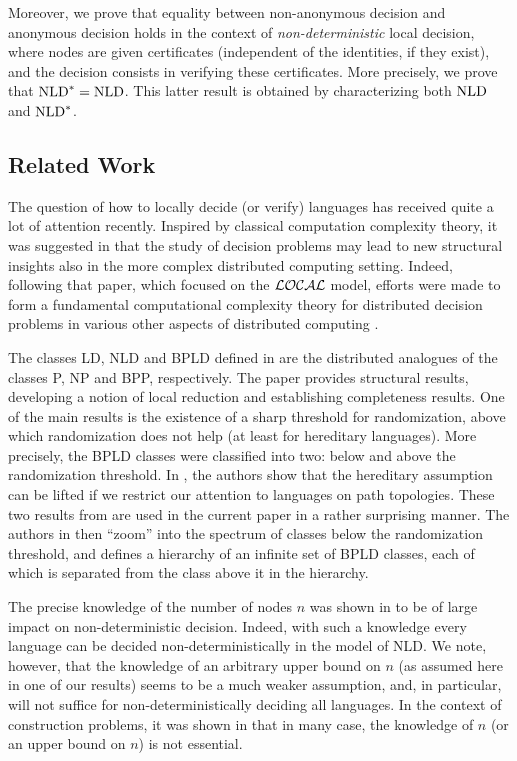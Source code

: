\documentclass{llncs}
\newcommand{\NLD}{\mbox{\rm NLD}}
\begin{document}
Moreover, we prove that equality between non-anonymous decision and anonymous decision holds in the context of \emph{non-deterministic} local decision, where nodes are given certificates (independent of the identities, if they exist), and the decision consists in verifying these certificates. More precisely, we prove that $\NLD^*=\NLD$. This latter result is obtained by characterizing both $\NLD$ and $\NLD^*$. 

\subsection{Related Work}
The question of how to locally decide (or verify)  languages has 
received quite a lot of attention recently. 
Inspired by classical computation complexity theory,
it was suggested in \cite{FKP11} that the study of decision problems may lead to new
structural insights also in the more complex distributed computing setting.
Indeed, following that paper, which focused on the $\cal{LOCAL}$ model, efforts were made to form a fundamental
computational complexity theory for distributed decision problems in
various other aspects of distributed computing
\cite{FKP11,FP12,FRT11,FRT12}.

The classes LD, NLD and BPLD defined in \cite{FKP11} are
the distributed analogues of the classes  P, NP and BPP, respectively.
The paper provides structural results,
developing a notion of local reduction and establishing completeness results.
One of the main results is the existence of a sharp threshold for randomization,
above which randomization does not help (at least for hereditary languages). 
More precisely, the BPLD classes were classified into two:
below and above the randomization threshold. 
In \cite{FKPP12}, the authors show that the hereditary assumption can be lifted if we restrict our attention
to languages on path topologies. 
These two results from \cite{FKP11,FKPP12}  are used in the current paper in a rather surprising manner. 
The authors in \cite{FKPP12} then 
``zoom''
into the spectrum of classes below the randomization threshold, and
defines a hierarchy of an infinite set of BPLD classes, each of which
is separated from the class above it in the hierarchy.


The precise knowledge of the number of nodes $n$ was shown in  \cite{FKP11} to be of large impact on non-deterministic decision. Indeed, with such a knowledge
every language can be decided non-deterministically in the model of NLD. We note, however, that the knowledge of an arbitrary upper bound on $n$ (as assumed here in one of our results) seems to be a much weaker assumption, and, in particular, will not suffice for non-deterministically deciding all languages. In the context of construction problems, it was shown in \cite{KSV11} that in many case, the knowledge of $n$ (or an upper bound on $n$) is not essential.
\end{document}
